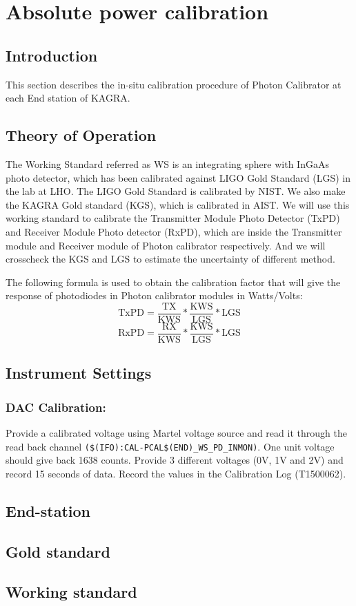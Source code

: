 
\chapter{Absolute power calibration} %
\label{Chapter5} %
\section{Introduction}
\label{sec:intro}
This section describes the in-situ calibration procedure of Photon Calibrator at each End station of KAGRA.

\section{Theory of Operation}

The Working Standard referred as WS  is an integrating sphere with InGaAs photo detector, which has been calibrated against LIGO Gold Standard (LGS) in the lab at LHO. The LIGO Gold Standard is calibrated by NIST. We also make the KAGRA Gold standard (KGS), which is calibrated in AIST.  We will use this working standard to calibrate the Transmitter Module Photo Detector (TxPD) and Receiver Module Photo detector (RxPD), which are inside the Transmitter module and Receiver module of Photon calibrator respectively. And we will crosscheck the KGS and LGS to estimate the uncertainty of different method.

The following formula is used to obtain the calibration factor that will give the response of photodiodes in Photon calibrator modules in Watts/Volts:
\
\begin{equation}
\mathrm{TxPD} = \frac{\mathrm{TX}}{\mathrm{KWS}}*\frac{\mathrm{KWS}}{\mathrm{LGS}}*\mathrm{LGS}
\end{equation}
\begin{equation}
\mathrm{RxPD} = \frac{\mathrm{RX}}{\mathrm{KWS}}*\frac{\mathrm{KWS}}{\mathrm{LGS}}*\mathrm{LGS}
\end{equation}

\section{Instrument Settings}
\subsection{DAC Calibration:}
Provide a calibrated voltage using Martel voltage source and read it through the read back channel \verb|($(IFO):CAL-PCAL$(END)_WS_PD_INMON)|. One unit voltage should give back 1638 counts.  Provide 3 different voltages (0V, 1V and 2V) and record 15 seconds of data.  Record the values in the Calibration Log (T1500062).

\section{End-station}
\section{Gold standard}
\section{Working standard}
